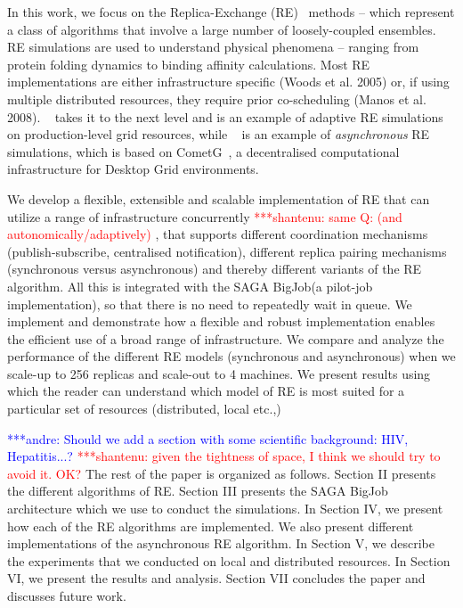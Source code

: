 \documentclass{rspublic}
\newcommand{\jhanote}[1]{ {\textcolor{red} { ***shantenu: #1 }}}
\newcommand{\alnote}[1]{ {\textcolor{blue} { ***andre: #1 }}}
\newcommand{\alnote}[1]{}
\newcommand{\jhanote}[1]{}
\begin{document}
In this work, we focus on the Replica-Exchange
(RE)~\citep{hansmann,Sugita:1999rm} methods -- which represent a class
of algorithms that involve a large number of loosely-coupled
ensembles.  RE simulations are used to understand physical phenomena
-- ranging from protein folding dynamics to binding affinity
calculations. Most RE implementations are either infrastructure
specific (Woods et al. 2005) or, if using multiple distributed
resources, they require prior co-scheduling (Manos et
al. 2008). ~\citep{Luckow:2008fp} takes it to the next level and is an
example of adaptive RE simulations on production-level grid resources,
while ~\citep{parashar_arepex} is an example of \emph{asynchronous} RE
simulations, which is based on
CometG~\citep{Li:2005:CSC:1090948.1091381}, a decentralised
computational infrastructure for Desktop Grid environments.

We develop a flexible, extensible and scalable implementation of RE
that can utilize a range of infrastructure concurrently \jhanote{same
  Q: (and autonomically/adaptively)}, that supports different
coordination mechanisms (publish-subscribe, centralised notification),
different replica pairing mechanisms (synchronous versus asynchronous)
and thereby different variants of the RE algorithm. All this is integrated with the SAGA BigJob(a pilot-job implementation), so that there is no need to repeatedly wait in queue. We implement and
demonstrate how a flexible and robust implementation enables the
efficient use of a broad range of infrastructure. We compare and
analyze the performance of the different RE models (synchronous and
asynchronous) when we scale-up to 256 replicas and scale-out to 4
machines.  We present results using which the reader can understand
which model of RE is most suited for a particular set of resources
(distributed, local etc.,)

\alnote{Should we add a section with some scientific background: HIV,
  Hepatitis...?}  \jhanote{given the tightness of space, I think we
  should try to avoid it. OK?} The rest of the paper is organized as
follows. Section II presents the different algorithms of RE. Section
III presents the SAGA BigJob architecture which we use to conduct the
simulations. In Section IV, we present how each of the RE algorithms
are implemented. We also present different implementations of the
asynchronous RE algorithm. In Section V, we describe the experiments
that we conducted on local and distributed resources. In Section VI,
we present the results and analysis. Section VII concludes the paper
and discusses future work.
\end{document}
